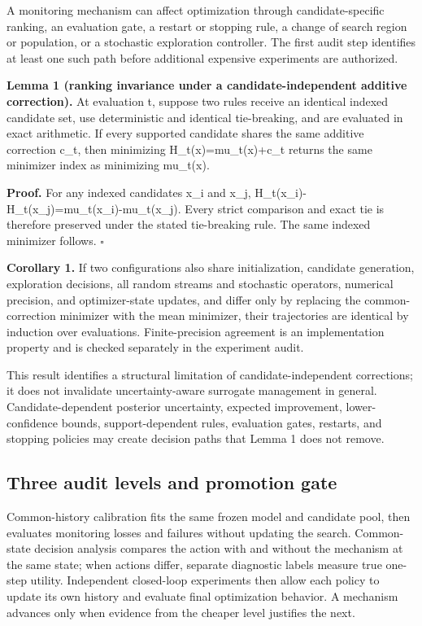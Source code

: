 \documentclass[cmc,article,submit,moreauthors,pdftex]{Definitions/tsp}
\begin{document}
A monitoring mechanism can affect optimization through candidate-specific ranking, an evaluation gate, a restart or stopping rule, a change of search region or population, or a stochastic exploration controller. The first audit step identifies at least one such path before additional expensive experiments are authorized.

\textbf{Lemma 1 (ranking invariance under a candidate-independent additive correction).} At evaluation t, suppose two rules receive an identical indexed candidate set, use deterministic and identical tie-breaking, and are evaluated in exact arithmetic. If every supported candidate shares the same additive correction c\_t, then minimizing H\_t(x)=mu\_t(x)+c\_t returns the same minimizer index as minimizing mu\_t(x).

\textbf{Proof.} For any indexed candidates x\_i and x\_j, H\_t(x\_i)-H\_t(x\_j)=mu\_t(x\_i)-mu\_t(x\_j). Every strict comparison and exact tie is therefore preserved under the stated tie-breaking rule. The same indexed minimizer follows. \(\square\)

\textbf{Corollary 1.} If two configurations also share initialization, candidate generation, exploration decisions, all random streams and stochastic operators, numerical precision, and optimizer-state updates, and differ only by replacing the common-correction minimizer with the mean minimizer, their trajectories are identical by induction over evaluations. Finite-precision agreement is an implementation property and is checked separately in the experiment audit.

This result identifies a structural limitation of candidate-independent corrections; it does not invalidate uncertainty-aware surrogate management in general. Candidate-dependent posterior uncertainty, expected improvement, lower-confidence bounds, support-dependent rules, evaluation gates, restarts, and stopping policies may create decision paths that Lemma 1 does not remove.

\hypertarget{three-audit-levels-and-promotion-gate}{%
\subsection{Three audit levels and promotion gate}\label{three-audit-levels-and-promotion-gate}}

Common-history calibration fits the same frozen model and candidate pool, then evaluates monitoring losses and failures without updating the search. Common-state decision analysis compares the action with and without the mechanism at the same state; when actions differ, separate diagnostic labels measure true one-step utility. Independent closed-loop experiments then allow each policy to update its own history and evaluate final optimization behavior. A mechanism advances only when evidence from the cheaper level justifies the next.
\end{document}
